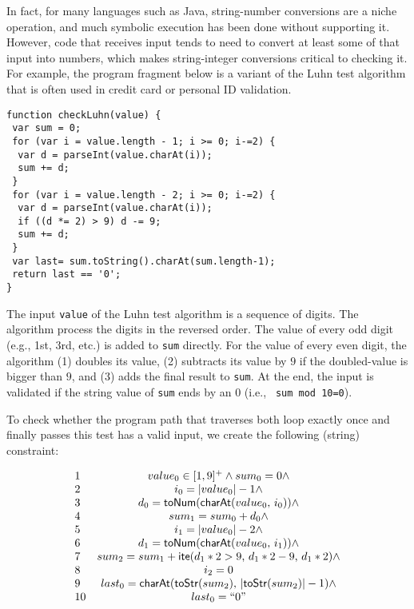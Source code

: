 \documentclass[sigplan,review,anonymous]{acmart}\settopmatter{printfolios=true,printccs=false,printacmref=false}
\begin{document}
In fact, for many languages such as Java, string-number conversions are a niche operation, and much symbolic execution has been done without supporting it. However, code that receives input tends to need to convert at least some of that input into numbers, which makes string-integer conversions critical to checking it. For example, the program fragment below is a variant of the Luhn test algorithm \cite{?} that is often used in credit card or personal ID validation.

\begin{Verbatim}[fontsize=\small]
function checkLuhn(value) {
 var sum = 0;
 for (var i = value.length - 1; i >= 0; i-=2) {
  var d = parseInt(value.charAt(i));
  sum += d;
 }	
 for (var i = value.length - 2; i >= 0; i-=2) {
  var d = parseInt(value.charAt(i));
  if ((d *= 2) > 9) d -= 9;
  sum += d;
 }
 var last= sum.toString().charAt(sum.length-1);
 return last == '0';
}
\end{Verbatim}


The input \verb|value| of the Luhn test algorithm is a sequence of digits. The algorithm process the digits in the reversed order. The value of every odd digit (e.g., 1st, 3rd, etc.) is added to \verb|sum| directly. For the value of every even digit, the algorithm (1) doubles its value, (2) subtracts its value by $9$ if the doubled-value is bigger than $9$, and (3) adds the final result to \verb|sum|. At the end, the input is validated if the string value of \verb|sum| ends by an $0$ (i.e., \verb| sum mod 10=0|).

To check whether the program path that traverses both loop exactly once and finally passes this test has a valid input, we create the following (string) constraint:

$$\begin{array}{lc}
1&	value_0 \in [1,9]^+ \wedge 	sum_0 = 0 \wedge \\
2&	i_0 = |value_0| -1 \wedge \\
3&	d_0 = \mbox{\textsf{toNum}($\mbox{\textsf{charAt}($value_0$, $i_0$)}$)} \wedge \\
4&	sum_1 = sum_0 + d_0 \wedge\\
5&	i_1 = |value_0| -2 \wedge \\
6&	d_1 = \mbox{\textsf{toNum}($\mbox{\textsf{charAt}($value_0$, $i_1$)}$)} \wedge \\
7&	sum_2 = sum_1 + \mbox{\textsf{ite}($d_1*2>9$, $d_1*2 -9$, $d_1*2$)} \wedge\\
8& i_2 = 0\\
9&	last_0 = \mbox{\textsf{charAt}($\mbox{\textsf{toStr}($sum_2$)}$, $|\mbox{\textsf{toStr}($sum_2$)}|-1$)} \wedge\\
10&	last_0 =``0"
\end{array}$$
\end{document}
